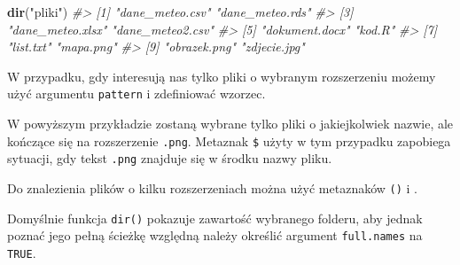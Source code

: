 \documentclass[paper=6in:9in,pagesize=pdftex,headinclude=on,footinclude=on,10pt]{scrbook}
\newenvironment{Shaded}{\begin{snugshade}}{\end{snugshade}}
\newcommand{\CharTok}[1]{\textcolor[rgb]{0.31,0.60,0.02}{#1}}
\newcommand{\CommentTok}[1]{\textcolor[rgb]{0.56,0.35,0.01}{\textit{#1}}}
\newcommand{\DataTypeTok}[1]{\textcolor[rgb]{0.13,0.29,0.53}{#1}}
\newcommand{\KeywordTok}[1]{\textcolor[rgb]{0.13,0.29,0.53}{\textbf{#1}}}
\newcommand{\NormalTok}[1]{#1}
\newcommand{\OtherTok}[1]{\textcolor[rgb]{0.56,0.35,0.01}{#1}}
\newcommand{\StringTok}[1]{\textcolor[rgb]{0.31,0.60,0.02}{#1}}
\begin{document}
\begin{Shaded}
\begin{Highlighting}[]
\KeywordTok{dir}\NormalTok{(}\StringTok{"pliki"}\NormalTok{)}
\CommentTok{#>  [1] "dane_meteo.csv"  "dane_meteo.rds" }
\CommentTok{#>  [3] "dane_meteo.xlsx" "dane_meteo2.csv"}
\CommentTok{#>  [5] "dokument.docx"   "kod.R"          }
\CommentTok{#>  [7] "list.txt"        "mapa.png"       }
\CommentTok{#>  [9] "obrazek.png"     "zdjecie.jpg"}
\end{Highlighting}
\end{Shaded}

W przypadku, gdy interesują nas tylko pliki o wybranym rozszerzeniu możemy użyć argumentu \texttt{pattern} i zdefiniować wzorzec.

\begin{Shaded}
\end{Shaded}

W powyższym przykładzie zostaną wybrane tylko pliki o jakiejkolwiek nazwie, ale kończące się na rozszerzenie \texttt{.png}.
Metaznak \texttt{\$} użyty w tym przypadku zapobiega sytuacji, gdy tekst \texttt{.png} znajduje się w środku nazwy pliku.

Do znalezienia plików o kilku rozszerzeniach można użyć metaznaków \texttt{()} i \texttt{\textbar{}}.

\begin{Shaded}
\end{Shaded}

Domyślnie funkcja \texttt{dir()} pokazuje zawartość wybranego folderu, aby jednak poznać jego pełną ścieżkę względną należy określić argument \texttt{full.names} na \texttt{TRUE}.

\begin{Shaded}
\end{Shaded}
\end{document}
